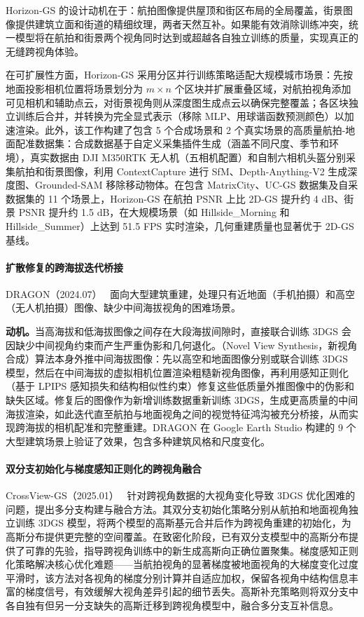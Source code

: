 Horizon-GS 的设计动机在于：航拍图像提供屋顶和街区布局的全局覆盖，街景图像提供建筑立面和街道的精细纹理，两者天然互补。如果能有效消除训练冲突，统一模型将在航拍和街景两个视角同时达到或超越各自独立训练的质量，实现真正的无缝跨视角体验。

在可扩展性方面，Horizon-GS 采用分区并行训练策略适配大规模城市场景：先按地面投影相机位置将场景划分为 $m\!\times\!n$ 个区块并扩展重叠区域，对航拍视角添加可见相机和辅助点云，对街景视角则从深度图生成点云以确保完整覆盖；各区块独立训练后合并，并转换为完全显式表示（移除 MLP、用球谐函数预测颜色）以加速渲染。此外，该工作构建了包含 5 个合成场景和 2 个真实场景的高质量航拍-地面配准数据集：合成数据基于自定义采集插件生成（涵盖不同尺度、季节和环境），真实数据由 DJI M350RTK 无人机（五相机配置）和自制六相机头盔分别采集航拍和街景图像，利用 ContextCapture 进行 SfM、Depth-Anything-V2 生成深度图、Grounded-SAM 移除移动物体。在包含 MatrixCity、UC-GS 数据集及自采数据集的 11 个场景上，Horizon-GS 在航拍 PSNR 上比 2D-GS 提升约 4 dB、街景 PSNR 提升约 1.5 dB，在大规模场景（如 Hillside\_Morning 和 Hillside\_Summer）上达到 51.5 FPS 实时渲染，几何重建质量也显著优于 2D-GS 基线。

\paragraph{扩散修复的跨海拔迭代桥接}

DRAGON（2024.07）~\cite{2407_01761} 面向大型建筑重建，处理只有近地面（手机拍摄）和高空（无人机拍摄）图像、缺少中间海拔视角的困难场景。

\textbf{动机。}当高海拔和低海拔图像之间存在大段海拔间隙时，直接联合训练 3DGS 会因缺少中间视角约束而产生严重伪影和几何退化。（Novel View Synthesis，新视角合成）算法本身外推中间海拔图像：先以高空和地面图像分别或联合训练 3DGS 模型，然后在中间海拔的虚拟相机位置渲染粗糙新视角图像，再利用感知正则化（基于 LPIPS 感知损失和结构相似性约束）修复这些低质量外推图像中的伪影和缺失区域。修复后的图像作为新增训练数据重新训练 3DGS，生成更高质量的中间海拔渲染，如此迭代直至航拍与地面视角之间的视觉特征鸿沟被充分桥接，从而实现跨海拔的相机配准和完整重建。DRAGON 在 Google Earth Studio 构建的 9 个大型建筑场景上验证了效果，包含多种建筑风格和尺度变化。

\paragraph{双分支初始化与梯度感知正则化的跨视角融合}

CrossView-GS（2025.01）~\cite{2501_01695} 针对跨视角数据的大视角变化导致 3DGS 优化困难的问题，提出多分支构建与融合方法。其双分支初始化策略分别从航拍和地面视角独立训练 3DGS 模型，将两个模型的高斯基元合并后作为跨视角重建的初始化，为高斯分布提供更完整的空间覆盖。在致密化阶段，已有双分支模型中的高斯分布提供了可靠的先验，指导跨视角训练中的新生成高斯向正确位置聚集。梯度感知正则化策略解决核心优化难题——当航拍视角的显著梯度被地面视角的大梯度变化过度平滑时，该方法对各视角的梯度分别计算并自适应加权，保留各视角中结构信息丰富的梯度信号，有效缓解大视角差异引起的细节丢失。高斯补充策略则将双分支中各自独有但另一分支缺失的高斯迁移到跨视角模型中，融合多分支互补信息。

